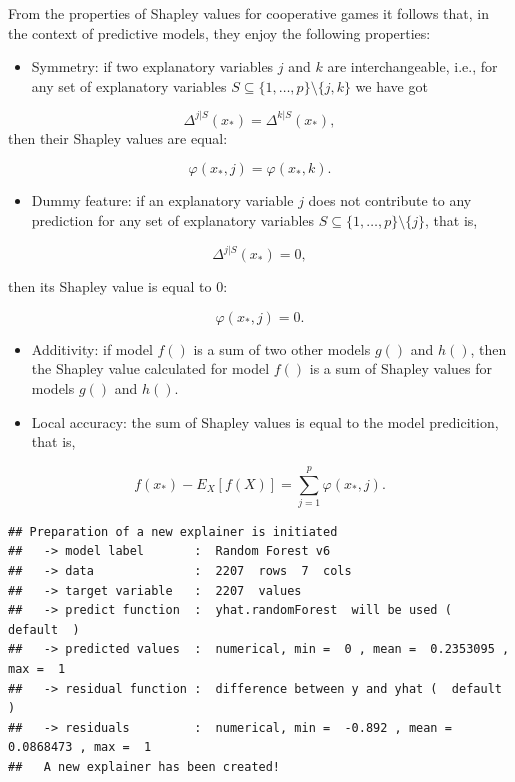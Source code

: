 \documentclass[12pt,]{krantz}
\providecommand{\tightlist}{%
  \setlength{\itemsep}{0pt}\setlength{\parskip}{0pt}}
\begin{document}
From the properties of Shapley values for cooperative games it follows that, in the context of predictive models, they enjoy the following properties:

\begin{itemize}
\tightlist
\item
  Symmetry: if two explanatory variables \(j\) and \(k\) are interchangeable, i.e., for any set of explanatory variables \(S \subseteq \{1,\dots,p\}\setminus \{j,k\}\) we have got
\end{itemize}

\[
\Delta^{j|S}(x_*) = \Delta^{k|S}(x_*),
\]
then their Shapley values are equal:

\[
\varphi(x_*,j) = \varphi(x_*,k).
\]

\begin{itemize}
\tightlist
\item
  Dummy feature: if an explanatory variable \(j\) does not contribute to any prediction for any set of explanatory variables \(S \subseteq \{1,\dots,p\}\setminus \{j\}\), that is,
\end{itemize}

\[
\Delta^{j|S}(x_*) = 0,
\]

then its Shapley value is equal to 0:

\[
\varphi(x_*,j) = 0.
\]

\begin{itemize}
\item
  Additivity: if model \(f()\) is a sum of two other models \(g()\) and \(h()\), then the Shapley value calculated for model \(f()\) is a sum of Shapley values for models \(g()\) and \(h()\).
\item
  Local accuracy: the sum of Shapley values is equal to the model predicition, that is,
\end{itemize}

\[
f(x_*) - E_X[f(X)] = \sum_{j=1}^p   \varphi(x_*,j). 
\]

\begin{verbatim}
## Preparation of a new explainer is initiated
##   -> model label       :  Random Forest v6 
##   -> data              :  2207  rows  7  cols 
##   -> target variable   :  2207  values 
##   -> predict function  :  yhat.randomForest  will be used (  default  )
##   -> predicted values  :  numerical, min =  0 , mean =  0.2353095 , max =  1  
##   -> residual function :  difference between y and yhat (  default  )
##   -> residuals         :  numerical, min =  -0.892 , mean =  0.0868473 , max =  1  
##   A new explainer has been created!
\end{verbatim}
\end{document}
